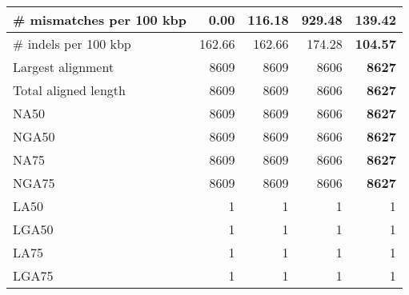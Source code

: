 \documentclass[12pt,a4paper]{article}
\begin{document}
\begin{table}[ht]
\begin{center}
\begin{tabular}{|l*{4}{|r}|}
\# mismatches per 100 kbp & {\bf 0.00} & 116.18 & 929.48 & 139.42 \\ \hline
\# indels per 100 kbp & 162.66 & 162.66 & 174.28 & {\bf 104.57} \\ \hline
Largest alignment & 8609 & 8609 & 8606 & {\bf 8627} \\ \hline
Total aligned length & 8609 & 8609 & 8606 & {\bf 8627} \\ \hline
NA50 & 8609 & 8609 & 8606 & {\bf 8627} \\ \hline
NGA50 & 8609 & 8609 & 8606 & {\bf 8627} \\ \hline
NA75 & 8609 & 8609 & 8606 & {\bf 8627} \\ \hline
NGA75 & 8609 & 8609 & 8606 & {\bf 8627} \\ \hline
LA50 & 1 & 1 & 1 & 1 \\ \hline
LGA50 & 1 & 1 & 1 & 1 \\ \hline
LA75 & 1 & 1 & 1 & 1 \\ \hline
LGA75 & 1 & 1 & 1 & 1 \\ \hline
\end{tabular}
\end{center}
\end{table}
\end{document}
